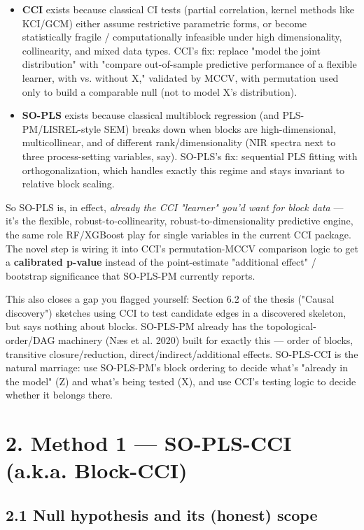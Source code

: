 \documentclass[11pt,a4paper]{article}
\begin{document}
	\begin{itemize}
		\item \textbf{CCI} exists because classical CI tests (partial correlation, kernel methods like KCI/GCM) either assume restrictive parametric forms, or become statistically fragile / computationally infeasible under high dimensionality, collinearity, and mixed data types. CCI's fix: replace "model the joint distribution" with "compare out-of-sample predictive performance of a flexible learner, with vs. without X," validated by MCCV, with permutation used only to build a comparable null (not to model X's distribution).
		\item \textbf{SO-PLS} exists because classical multiblock regression (and PLS-PM/LISREL-style SEM) breaks down when blocks are high-dimensional, multicollinear, and of different rank/dimensionality (NIR spectra next to three process-setting variables, say). SO-PLS's fix: sequential PLS fitting with orthogonalization, which handles exactly this regime and stays invariant to relative block scaling.
		
	\end{itemize}
	So SO-PLS is, in effect, \emph{already the CCI "learner" you'd want for block data} — it's the flexible, robust-to-collinearity, robust-to-dimensionality predictive engine, the same role RF/XGBoost play for single variables in the current CCI package. The novel step is wiring it into CCI's permutation-MCCV comparison logic to get a \textbf{calibrated p-value} instead of the point-estimate "additional effect" / bootstrap significance that SO-PLS-PM currently reports.
	
	This also closes a gap you flagged yourself: Section 6.2 of the thesis ("Causal discovery") sketches using CCI to test candidate edges in a discovered skeleton, but says nothing about blocks. SO-PLS-PM already has the topological-order/DAG machinery (Næs et al. 2020) built for exactly this — order of blocks, transitive closure/reduction, direct/indirect/additional effects. SO-PLS-CCI is the natural marriage: use SO-PLS-PM's block ordering to decide what's "already in the model" (Z) and what's being tested (X), and use CCI's testing logic to decide whether it belongs there.
	
	
	\section{2. Method 1 — SO-PLS-CCI (a.k.a. Block-CCI)}
	
	\subsection{2.1 Null hypothesis and its (honest) scope}
	
\end{document}
